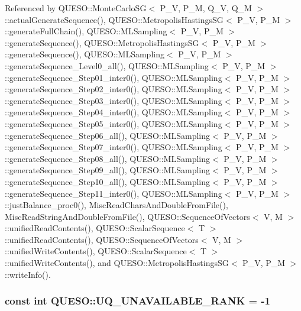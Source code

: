 Referenced by Q\-U\-E\-S\-O\-::\-Monte\-Carlo\-S\-G$<$ P\-\_\-\-V, P\-\_\-\-M, Q\-\_\-\-V, Q\-\_\-\-M $>$\-::actual\-Generate\-Sequence(), Q\-U\-E\-S\-O\-::\-Metropolis\-Hastings\-S\-G$<$ P\-\_\-\-V, P\-\_\-\-M $>$\-::generate\-Full\-Chain(), Q\-U\-E\-S\-O\-::\-M\-L\-Sampling$<$ P\-\_\-\-V, P\-\_\-\-M $>$\-::generate\-Sequence(), Q\-U\-E\-S\-O\-::\-Metropolis\-Hastings\-S\-G$<$ P\-\_\-\-V, P\-\_\-\-M $>$\-::generate\-Sequence(), Q\-U\-E\-S\-O\-::\-M\-L\-Sampling$<$ P\-\_\-\-V, P\-\_\-\-M $>$\-::generate\-Sequence\-\_\-\-Level0\-\_\-all(), Q\-U\-E\-S\-O\-::\-M\-L\-Sampling$<$ P\-\_\-\-V, P\-\_\-\-M $>$\-::generate\-Sequence\-\_\-\-Step01\-\_\-inter0(), Q\-U\-E\-S\-O\-::\-M\-L\-Sampling$<$ P\-\_\-\-V, P\-\_\-\-M $>$\-::generate\-Sequence\-\_\-\-Step02\-\_\-inter0(), Q\-U\-E\-S\-O\-::\-M\-L\-Sampling$<$ P\-\_\-\-V, P\-\_\-\-M $>$\-::generate\-Sequence\-\_\-\-Step03\-\_\-inter0(), Q\-U\-E\-S\-O\-::\-M\-L\-Sampling$<$ P\-\_\-\-V, P\-\_\-\-M $>$\-::generate\-Sequence\-\_\-\-Step04\-\_\-inter0(), Q\-U\-E\-S\-O\-::\-M\-L\-Sampling$<$ P\-\_\-\-V, P\-\_\-\-M $>$\-::generate\-Sequence\-\_\-\-Step05\-\_\-inter0(), Q\-U\-E\-S\-O\-::\-M\-L\-Sampling$<$ P\-\_\-\-V, P\-\_\-\-M $>$\-::generate\-Sequence\-\_\-\-Step06\-\_\-all(), Q\-U\-E\-S\-O\-::\-M\-L\-Sampling$<$ P\-\_\-\-V, P\-\_\-\-M $>$\-::generate\-Sequence\-\_\-\-Step07\-\_\-inter0(), Q\-U\-E\-S\-O\-::\-M\-L\-Sampling$<$ P\-\_\-\-V, P\-\_\-\-M $>$\-::generate\-Sequence\-\_\-\-Step08\-\_\-all(), Q\-U\-E\-S\-O\-::\-M\-L\-Sampling$<$ P\-\_\-\-V, P\-\_\-\-M $>$\-::generate\-Sequence\-\_\-\-Step09\-\_\-all(), Q\-U\-E\-S\-O\-::\-M\-L\-Sampling$<$ P\-\_\-\-V, P\-\_\-\-M $>$\-::generate\-Sequence\-\_\-\-Step10\-\_\-all(), Q\-U\-E\-S\-O\-::\-M\-L\-Sampling$<$ P\-\_\-\-V, P\-\_\-\-M $>$\-::generate\-Sequence\-\_\-\-Step11\-\_\-inter0(), Q\-U\-E\-S\-O\-::\-M\-L\-Sampling$<$ P\-\_\-\-V, P\-\_\-\-M $>$\-::just\-Balance\-\_\-proc0(), Misc\-Read\-Chars\-And\-Double\-From\-File(), Misc\-Read\-String\-And\-Double\-From\-File(), Q\-U\-E\-S\-O\-::\-Sequence\-Of\-Vectors$<$ V, M $>$\-::unified\-Read\-Contents(), Q\-U\-E\-S\-O\-::\-Scalar\-Sequence$<$ T $>$\-::unified\-Read\-Contents(), Q\-U\-E\-S\-O\-::\-Sequence\-Of\-Vectors$<$ V, M $>$\-::unified\-Write\-Contents(), Q\-U\-E\-S\-O\-::\-Scalar\-Sequence$<$ T $>$\-::unified\-Write\-Contents(), and Q\-U\-E\-S\-O\-::\-Metropolis\-Hastings\-S\-G$<$ P\-\_\-\-V, P\-\_\-\-M $>$\-::write\-Info().

\hypertarget{namespace_q_u_e_s_o_a7d4679800a430ae8e473c1c7bc0bfb21}{
\subsubsection[{U\-Q\-\_\-\-U\-N\-A\-V\-A\-I\-L\-A\-B\-L\-E\-\_\-\-R\-A\-N\-K}]{\setlength{\rightskip}{0pt plus 5cm}const int Q\-U\-E\-S\-O\-::\-U\-Q\-\_\-\-U\-N\-A\-V\-A\-I\-L\-A\-B\-L\-E\-\_\-\-R\-A\-N\-K = -\/1}}\label{namespace_q_u_e_s_o_a7d4679800a430ae8e473c1c7bc0bfb21}



